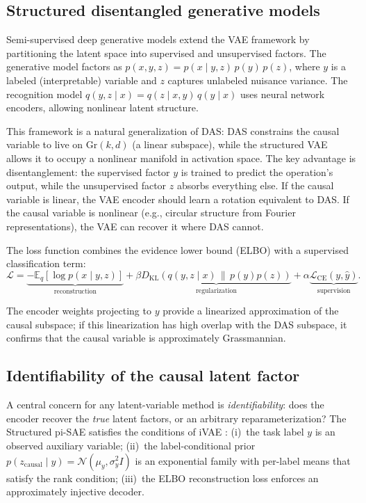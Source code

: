 \documentclass{article}
\newcommand{\Gr}{\mathrm{Gr}}
\begin{document}
\subsection{Structured disentangled generative models}
\label{sec:structured_vae}

Semi-supervised deep generative models \citep{narayanaswamy2017learning} extend
the VAE framework \citep{kingma2014auto} by partitioning the latent space into
supervised and unsupervised factors. The generative model factors as
$p(x, y, z) = p(x \mid y, z) \, p(y) \, p(z)$, where $y$ is a labeled
(interpretable) variable and $z$ captures unlabeled nuisance variance. The
recognition model $q(y, z \mid x) = q(z \mid x, y) \, q(y \mid x)$ uses neural
network encoders, allowing nonlinear latent structure.

This framework is a natural generalization of DAS: DAS constrains the causal
variable to live on $\Gr(k,d)$ (a linear subspace), while the structured VAE
allows it to occupy a nonlinear manifold in activation space. The key advantage
is disentanglement: the supervised factor $y$ is trained to predict the
operation's output, while the unsupervised factor $z$ absorbs everything else.
If the causal variable is linear, the VAE encoder should learn a rotation
equivalent to DAS. If the causal variable is nonlinear (e.g., circular
structure from Fourier representations), the VAE can recover it where DAS
cannot.

The loss function combines the evidence lower bound (ELBO) with a supervised
classification term:
\begin{equation}
\mathcal{L} = \underbrace{-\mathbb{E}_{q}[\log p(x \mid y, z)]}_{\text{reconstruction}}
+ \beta \underbrace{D_\mathrm{KL}(q(y,z \mid x) \,\|\, p(y) p(z))}_{\text{regularization}}
+ \alpha \underbrace{\mathcal{L}_\text{CE}(y, \hat{y})}_{\text{supervision}}.
\label{eq:vae_loss}
\end{equation}

The encoder weights projecting to $y$ provide a linearized approximation of the
causal subspace; if this linearization has high overlap with the DAS subspace,
it confirms that the causal variable is approximately Grassmannian.

\subsection{Identifiability of the causal latent factor}
\label{sec:identifiability}

A central concern for any latent-variable method is \emph{identifiability}:
does the encoder recover the \emph{true} latent factors, or an arbitrary
reparameterization? The Structured pi-SAE satisfies the conditions of iVAE
\citep{khemakhem2020variational}: (i)~the task label $y$ is an observed
auxiliary variable; (ii)~the label-conditional prior
$p(z_\text{causal} \mid y) = \mathcal{N}(\mu_y, \sigma_y^2 I)$ is an
exponential family with per-label means that satisfy the rank condition;
(iii)~the ELBO reconstruction loss enforces an approximately injective
decoder.
\end{document}
